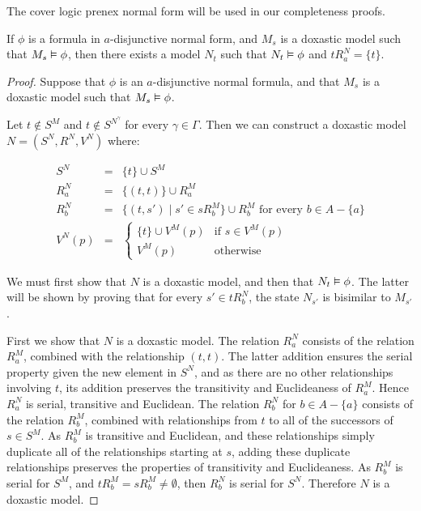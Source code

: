 The cover logic prenex normal form will be used in our completeness proofs.

\begin{lemma}\label{kd45-successors}
If $\phi$ is a formula in $a$-disjunctive normal form, and $M_s$ is a doxastic
model such that $M_s \vDash \phi$, then there exists a model $N_t$ such that
$N_t \vDash \phi$ and $tR^N_a = \{t\}$.
\end{lemma}

\begin{proof}
Suppose that $\phi$ is an $a$-disjunctive normal formula, and that $M_s$ is a
doxastic model such that $M_s \vDash \phi$. 

Let $t \notin S^M$ and $t \notin S^{N^\gamma}$ for every $\gamma \in \Gamma$.
Then we can construct a doxastic model $N = (S^N, R^N, V^N)$ where:

\begin{eqnarray*}
S^N &=& \{t\} \cup S^M\\
R^N_a &=& \{(t, t)\} \cup R^M_a\\
R^N_b &=& \{(t, s') \mid s' \in sR^M_b\} \cup R^M_b \text{ for every $b \in A -
\{a\}$}\\
V^N(p) &=& \begin{cases}
\{t\} \cup V^M(p) & \text{if $s \in V^M(p)$}\\
V^M(p) & \text{otherwise}
\end{cases}
\end{eqnarray*}

We must first show that $N$ is a doxastic model, and then that $N_t \vDash
\phi$. The latter will be shown by proving that for every $s' \in tR^N_b$, the
state $N_{s'}$ is bisimilar to $M_{s'}$.

First we show that $N$ is a doxastic model. The relation $R^N_a$ consists of the
relation $R^M_a$, combined with the relationship $(t,t)$. The latter addition
ensures the serial property given the new element in $S^N$, and as there are no
other relationships involving $t$, its addition preserves the transitivity and
Euclideaness of $R^M_a$. Hence $R^N_a$ is serial, transitive and Euclidean.
The relation $R^N_b$ for $b \in A - \{a\}$ consists of the relation $R^M_b$,
combined with relationships from $t$ to all of the successors of $s \in S^M$. As
$R^M_b$ is transitive and Euclidean, and these relationships simply duplicate
all of the relationships starting at $s$, adding these duplicate relationships
preserves the properties of transitivity and Euclideaness. As $R^M_b$ is serial
for $S^M$, and $tR^M_b = sR^M_b \ne \emptyset$, then $R^N_b$ is serial for
$S^N$. Therefore $N$ is a doxastic model.


\end{proof}

